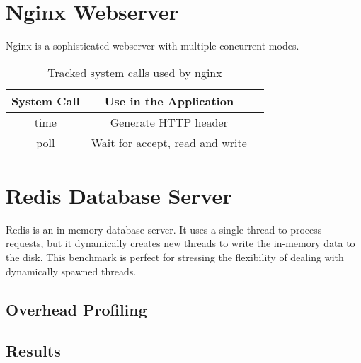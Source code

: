 
\section{Nginx Webserver}
Nginx is a sophisticated webserver with multiple concurrent modes.

\begin{table}
\caption{Tracked system calls used by nginx}
\begin{center}
 \begin{tabular}{c | c | c}
System Call & Use in the Application\\ \hline
 time & Generate HTTP header\\ \hline
 poll & Wait for accept, read and write
 \end{tabular}
\end{center}
\label{t:nginx_syscall}
\end{table}


\section{Redis Database Server}
Redis is an in-memory database server. It uses a single thread to process requests, but it dynamically creates new threads to write the in-memory data to the disk. This benchmark is perfect for stressing the flexibility of dealing with dynamically spawned threads.

\subsection{Overhead Profiling}
\subsection{Results}


